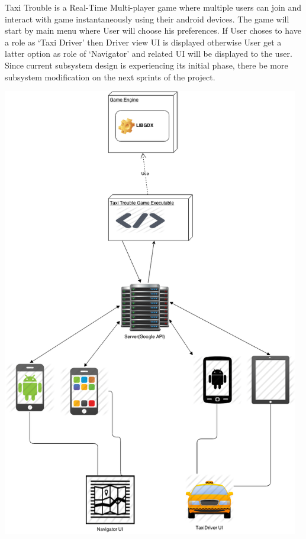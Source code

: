 
Taxi Trouble is a Real-Time Multi-player game where multiple users can join and interact with game instantaneously using their android devices. The game will start by main menu where User will choose his preferences. If User choses to have a role as `Taxi Driver' then Driver view UI is displayed otherwise User get a latter option as role of  `Navigator' and related UI will be displayed to the user. Since current subsystem design is experiencing its initial phase, there be more subsystem modification on the next sprints of the project.\\


\begin{center}
	 \includegraphics[width=130mm]{./images/hardsoft.png}
\end{center}